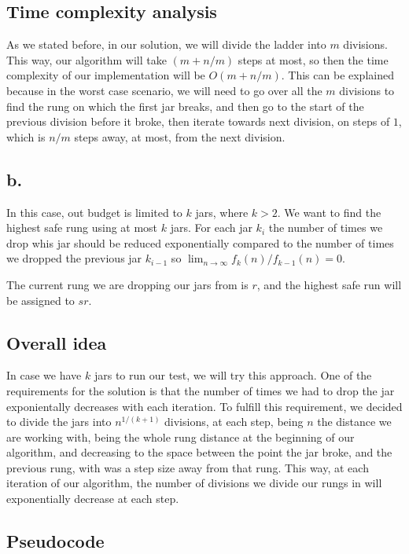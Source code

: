 \documentclass{article}
\begin{document}
\subsection*{Time complexity analysis}

As we stated before, in our solution, we will divide the ladder into $m$ divisions. This way, our algorithm will take $(m+n/m)$ steps at most, so then the time complexity of our implementation will be $O(m+n/m)$. This can be explained because in the worst case scenario, we will need to go over all the $m$ divisions to find the rung on which the first jar breaks, and then go to the start of the previous division before it broke, then iterate towards next division, on steps of $1$, which is $n/m$ steps away, at most, from the next division.

\subsection*{b.}

In this case, out budget is limited to $k$ jars, where $k>2$. We want to find the highest safe rung using at most $k$ jars. For each jar $k_i$ the number of times we drop whis jar should be reduced exponentially compared to the number of times we dropped the previous jar $k_{i-1}$ so $\lim_{n\to\infty} f_k(n)/f_{k-1}(n) = 0$.

The current rung we are dropping our jars from is $r$, and the highest safe run will be assigned to $sr$.

\subsection*{Overall idea}

In case we have $k$ jars to run our test, we will try this approach. One of the requirements for the solution is that the number of times we had to drop the jar exponientally decreases with each iteration. To fulfill this requirement, we decided to divide the jars into $n^{1/(k+1)}$ divisions, at each step, being $n$ the distance we are working with, being the whole rung distance at the beginning of our algorithm, and decreasing to the space between the point the jar broke, and the previous rung, with was a step size away from that rung. This way, at each iteration of our algorithm, the number of divisions we divide our rungs in will exponentially decrease at each step.

\subsection*{Pseudocode}
\end{document}
